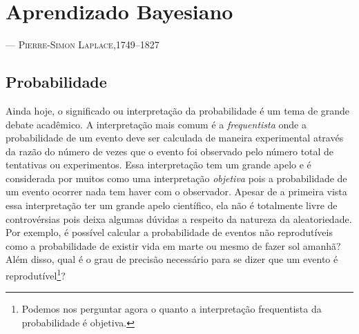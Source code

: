 \chapter{Aprendizado Bayesiano} %
\label{chap:apbayes}

\begin{epigraphs}
{\---- \textsc{Pierre-Simon Laplace,1749–1827}}
\end{epigraphs}

\section{Probabilidade} %

Ainda hoje, o significado ou interpretação da probabilidade é um tema
de grande debate acadêmico. A interpretação mais
comum é a \textit{frequentista} onde a probabilidade de um evento deve
ser calculada de maneira experimental através da razão do número de
vezes que o evento foi observado pelo número total de tentativas ou
experimentos. Essa interpretação tem um grande apelo e é considerada por
muitos como uma interpretação \textit{objetiva} pois a probabilidade de um
evento ocorrer nada tem haver com o observador. Apesar de a primeira vista
essa interpretação ter um grande apelo científico, ela não é totalmente
livre de controvérsias  pois deixa algumas dúvidas a respeito da natureza
da aleatoriedade. Por exemplo, é possível calcular a probabilidade de eventos
não reprodutíveis como a probabilidade de existir vida em marte ou mesmo
de fazer sol amanhã?  Além disso, qual é o grau de precisão necessário
para se dizer que um evento é reprodutível\footnote{Podemos nos perguntar agora
o quanto a interpretação frequentista da probabilidade é objetiva.}?


